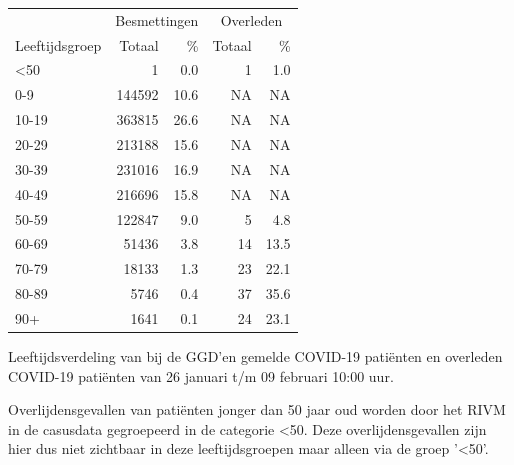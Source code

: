 \documentclass[
  english,
  man,floatsintext]{apa6}
\begin{document}
\begin{table}
\centering\begingroup\fontsize{11}{13}\selectfont

\begin{threeparttable}
\begin{tabular}{lrrrr}
\toprule
\multicolumn{1}{c}{ } & \multicolumn{2}{c}{Besmettingen} & \multicolumn{2}{c}{Overleden} \\
\cmidrule(l{3pt}r{3pt}){2-3} \cmidrule(l{3pt}r{3pt}){4-5}
Leeftijdsgroep & Totaal & \% & Totaal & \%\\
\midrule
<50 & 1 & 0.0 & 1 & 1.0\\
0-9 & 144592 & 10.6 & NA & NA\\
10-19 & 363815 & 26.6 & NA & NA\\
20-29 & 213188 & 15.6 & NA & NA\\
30-39 & 231016 & 16.9 & NA & NA\\
40-49 & 216696 & 15.8 & NA & NA\\
50-59 & 122847 & 9.0 & 5 & 4.8\\
60-69 & 51436 & 3.8 & 14 & 13.5\\
70-79 & 18133 & 1.3 & 23 & 22.1\\
80-89 & 5746 & 0.4 & 37 & 35.6\\
90+ & 1641 & 0.1 & 24 & 23.1\\
\bottomrule
\end{tabular}
\begin{tablenotes}
\item[1] Leeftijdsverdeling van bij de GGD’en gemelde COVID-19 patiënten en overleden COVID-19 patiënten van 26 januari t/m 09 februari 10:00 uur.
\item[2] Overlijdensgevallen van patiënten jonger dan 50 jaar oud worden door het RIVM in de casusdata gegroepeerd in de categorie <50. Deze overlijdensgevallen zijn hier dus niet zichtbaar in deze leeftijdsgroepen maar alleen via de groep '<50'.
\end{tablenotes}
\end{threeparttable}
\endgroup{}
\end{table}

\newpage
\end{document}
